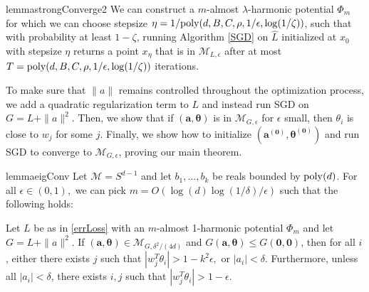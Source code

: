 \begin{restatable}{lemma}{strongConverge2}\label{strongConverge2}  
We can construct a $m$-almost $\lambda$-harmonic potential $\Phi_m$ for which
we can choose stepsize $\eta = 1/\mathrm{poly}(d,B,C,\rho,1/\epsilon,\log(1/\zeta))$, such that with probability at least $1-\zeta$, running Algorithm \ref{SGD} on $\widehat{L}$ initialized at $x_0$ with stepsize $\eta$  returns a point $x_\eta$ that is in $\mathcal{M}_{L, \epsilon}$ after at most $T = \mathrm{poly}(d,B,C,\rho,1/\epsilon, \log(1/\zeta))$ iterations. 
\end{restatable}

To make sure that $\|a\|$ remains controlled throughout the optimization process, we add a quadratic regularization term to $L$ and instead run SGD on $G = L + \|a\|^2$. Then, we show that if $(\boldsymbol{a,\theta})$ is in $\mathcal{M}_{G, \epsilon}$ for $\epsilon$ small, then $\theta_i$ is close to $w_j$ for some $j$. Finally, we show how to initialize $(\boldsymbol{a^{(0)},\theta^{(0)}})$ and run SGD to converge to $\mathcal{M}_{G,\epsilon}$, proving our main theorem.
%
%
\begin{restatable}{lemma}{eigConv}
\label{eigConv}
Let $\mathcal{M} = S^{d-1}$ and let $b_1,...,b_k$ be reals bounded by
$\mathrm{poly}(d)$. For all $\epsilon \in (0,1),$ we can pick
$m = O(\log(d)\log(1/\delta)/\epsilon)$ such that the following holds:

Let $L$ be as in \eqref{errLoss} with an $m$-almost 1-harmonic
potential $\Phi_m$ and let $G = L + \|a\|^2$.  If
$(\boldsymbol{a,\theta}) \in \mathcal{M}_{G, \delta^2 / (4d)}$ and
$G(\boldsymbol{a,\theta}) \leq G(\boldsymbol{0, 0})$, then for all
$i$, either there exists $j$ such that
$|w_j^T\theta_i| > 1- k^2\epsilon,$ or $|a_i| < \delta$. Furthermore, unless all $|a_i| <\delta$,  there exists $i, j$ such that $|w_j^T\theta_i| > 1-\epsilon$.
\end{restatable}
%
